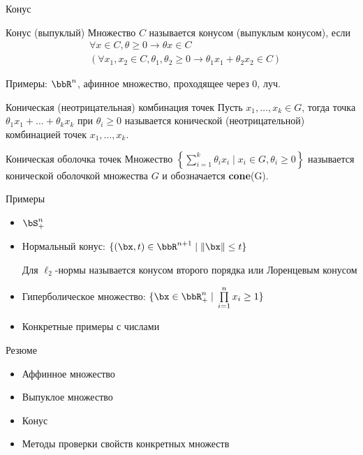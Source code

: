 \documentclass[12pt,russian]{beamer}
\begin{document}
\begin{frame}{Конус}
\small
\begin{block}{Конус (выпуклый)}
Множество $C$ называется конусом (выпуклым конусом), если 
\vspace{-4mm}
\begin{equation*}
\begin{split}
& \forall x \in C, \theta \geq 0 \rightarrow \theta x \in C \\
& (\forall x_1, x_2 \in C, \theta_1, \theta_2 \geq 0 \rightarrow \theta_1 x_1 + \theta_2 x_2 \in C)
\end{split}
\end{equation*}
\vspace{-4mm}
\end{block}
Примеры: $\bbR^n$, афинное множество, проходящее через 0, луч.
\begin{block}{Коническая (неотрицательная) комбинация точек}
Пусть $x_1, \ldots, x_k \in G$, тогда точка $\theta_1 x_1 + \ldots + \theta_k x_k$ при $\theta_i \geq 0$ называется конической (неотрицательной) комбинацией точек $x_1,\ldots,x_k$.
\end{block}

\begin{block}{Коническая оболочка точек}
Множество $\left\{ \sum\limits_{i=1}^k \theta_i x_i \; | \; x_i \in G, \theta_i \geq 0 \right\}$ называется конической оболочкой множества $G$ и обозначается \textbf{cone}(G).
\end{block}
\end{frame}

\begin{frame}{Примеры}
\begin{itemize}
\item $\bS^n_+$
\item Нормальный конус: $\{ (\bx, t) \in \bbR^{n+1} \; | \; \| \bx \| \leq t \}$ 

Для $\ell_2$-нормы называется конусом второго порядка или Лоренцевым конусом
\item Гиперболическое множество: $\{ \bx \in \bbR^n_+ \; | \; \prod\limits_{i=1}^n x_i \geq 1 \}$
\item Конкретные примеры с числами
\end{itemize}
\end{frame}

\begin{frame}{Резюме}
\begin{itemize}
\item Аффинное множество
\item Выпуклое множество
\item Конус
\item Методы проверки свойств конкретных множеств
\end{itemize}
\end{frame}
\end{document}
